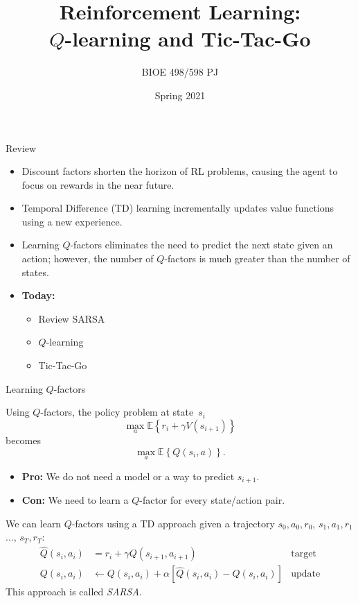 \documentclass[9pt]{beamer}
\title{Reinforcement Learning:\\$Q$-learning and Tic-Tac-Go}
\author{BIOE 498/598 PJ}
\date{Spring 2021}
\newcommand\pskip{\pause\bigskip}
\newcommand\lspace{\addtolength{\itemsep}{0.5\baselineskip}}
\begin{document}
\frame{\titlepage}


\begin{frame}{Review}

\begin{itemize}\lspace
	\item Discount factors shorten the horizon of RL problems, causing the agent to focus on rewards in the near future.
	\item Temporal Difference (TD) learning incrementally updates value functions using a new experience.
	\item Learning $Q$-factors eliminates the need to predict the next state given an action; however, the number of $Q$-factors is much greater than the number of states.
	\item<2-> \textbf{Today:}
		\begin{itemize}\lspace
			\item Review SARSA
			\item $Q$-learning
			\item Tic-Tac-Go
		\end{itemize}
\end{itemize}
	
\end{frame}

\begin{frame}{Learning $Q$-factors}

Using $Q$-factors, the policy problem at state~$s_i$
	\[ \max_{a} \mathbb{E}\left\{ r_i + \gamma V(s_{i+1}) \right\} \]
becomes
	\[ \max_{a} \mathbb{E}\left\{ Q(s_i,a) \right\}. \]

\pskip
\begin{itemize}
	\item \textbf{Pro:} We do not need a model or a way to predict $s_{i+1}$.
	\item \textbf{Con:} We need to learn a $Q$-factor for every state/action pair.
\end{itemize}

\pskip
We can learn $Q$-factors using a TD approach given a trajectory $s_0,a_0,r_0$, $s_1,a_1,r_1$ $\ldots$, $s_T,r_T$:
\begin{align*}
	\hat{Q}(s_i,a_i) &= r_i + \gamma Q(s_{i+1},a_{i+1}) & \text{target} \\
	Q(s_i,a_i) &\leftarrow Q(s_i,a_i) + \alpha\left[ \hat{Q}(s_i,a_i) - Q(s_i,a_i) \right] & \text{update}
\end{align*}
This approach is called \emph{SARSA}.

\end{frame}
\end{document}
